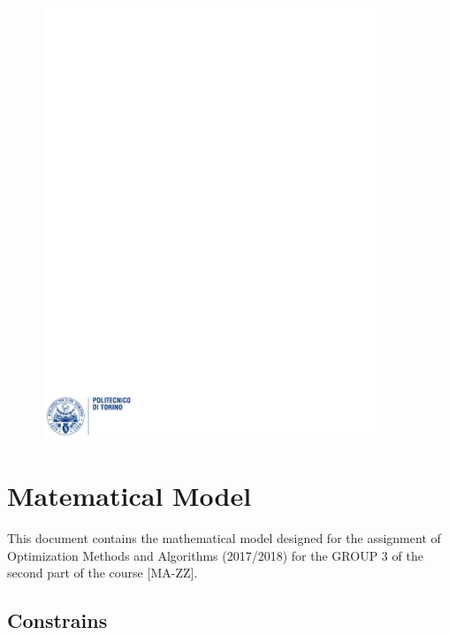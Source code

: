 \documentclass[12pt]{article}
\begin{document}
\begin{figure}
  \centering
  \includegraphics[width=10cm]{images/polito.pdf}
\end{figure}

\maketitle %
\newpage

\section{Matematical Model}
This document contains the mathematical model designed for the assignment of Optimization Methods and Algorithms (2017/2018) for the GROUP 3 of the second part of the course [MA-ZZ].
\subsection{Constrains}





\end{document}
